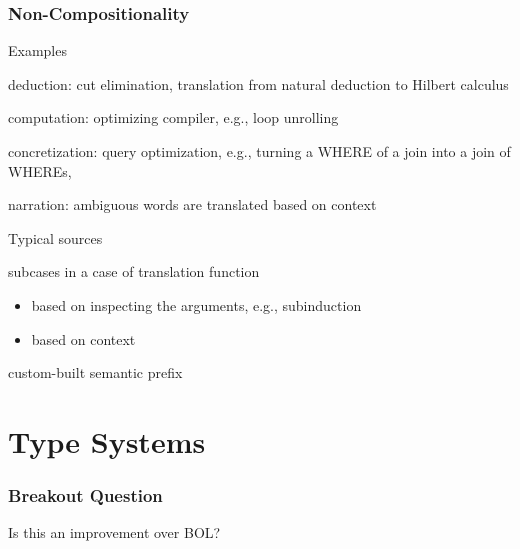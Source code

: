 \documentclass{beamer}
\begin{document}
\begin{frame}\frametitle{Non-Compositionality}
\begin{blockitems}{Examples}
 \item deduction: cut elimination, translation from natural deduction to Hilbert calculus
 \item computation: optimizing compiler, e.g., loop unrolling
 \item concretization: query optimization, e.g., turning a WHERE of a join into a join of WHEREs,
 \item narration: ambiguous words are translated based on context
\end{blockitems}

\begin{blockitems}{Typical sources}
 \item subcases in a case of translation function
  \begin{itemize}
  \item based on inspecting the arguments, e.g., subinduction
  \item based on context
  \end{itemize}
 \item custom-built semantic prefix
\end{blockitems}
\end{frame}

\section{Type Systems}

\begin{frame}\frametitle{Breakout Question}
Is this an improvement over BOL?
\begin{commgrammar}
\\
\\
\\
\\
\\
\end{commgrammar}
\end{frame}
\end{document}
